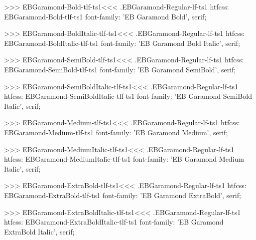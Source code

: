 {{{{{{{>>>
\<EBGaramond-Bold-tlf-ts1\><<<
.EBGaramond-Regular-lf-ts1
htfcss:  EBGaramond-Bold-tlf-ts1  font-family: 'EB Garamond Bold', serif;

>>>
\<EBGaramond-BoldItalic-tlf-ts1\><<<
.EBGaramond-Regular-lf-ts1
htfcss:  EBGaramond-BoldItalic-tlf-ts1  font-family: 'EB Garamond Bold Italic', serif;

>>>
\<EBGaramond-SemiBold-tlf-ts1\><<<
.EBGaramond-Regular-lf-ts1
htfcss:  EBGaramond-SemiBold-tlf-ts1  font-family: 'EB Garamond SemiBold', serif;

>>>
\<EBGaramond-SemiBoldItalic-tlf-ts1\><<<
.EBGaramond-Regular-lf-ts1
htfcss:  EBGaramond-SemiBoldItalic-tlf-ts1  font-family: 'EB Garamond SemiBold Italic', serif;

>>>
\<EBGaramond-Medium-tlf-ts1\><<<
.EBGaramond-Regular-lf-ts1
htfcss:  EBGaramond-Medium-tlf-ts1  font-family: 'EB Garamond Medium', serif;

>>>
\<EBGaramond-MediumItalic-tlf-ts1\><<<
.EBGaramond-Regular-lf-ts1
htfcss:  EBGaramond-MediumItalic-tlf-ts1  font-family: 'EB Garamond Medium Italic', serif;

>>>
\<EBGaramond-ExtraBold-tlf-ts1\><<<
.EBGaramond-Regular-lf-ts1
htfcss:  EBGaramond-ExtraBold-tlf-ts1  font-family: 'EB Garamond ExtraBold', serif;

>>>
\<EBGaramond-ExtraBoldItalic-tlf-ts1\><<<
.EBGaramond-Regular-lf-ts1
htfcss:  EBGaramond-ExtraBoldItalic-tlf-ts1  font-family: 'EB Garamond ExtraBold Italic', serif;

}}}}}}}
